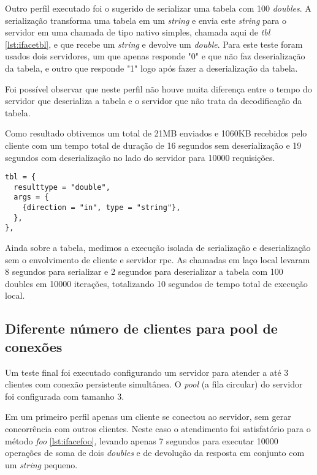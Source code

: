 \documentclass[11pt]{article}
\begin{document}
Outro perfil executado foi o sugerido de serializar uma tabela com 100
\textit{doubles}. A serialização transforma uma tabela em um \textit{string} e
envia este \textit{string} para o servidor em uma chamada de tipo nativo
simples, chamada aqui de \textit{tbl} \ref{lst:ifacetbl}, e que recebe um
\textit{string} e devolve um \textit{double}. Para este teste foram usados dois
servidores, um que apenas responde "0" e que não faz deserialização da tabela, e
outro que responde "1" logo após fazer a deserialização da tabela.

Foi possível observar que neste perfil não houve muita diferença entre o tempo
do servidor que deserializa a tabela e o servidor que não trata da decodificação
da tabela.

Como resultado obtivemos um total de 21MB enviados e 1060KB recebidos pelo
cliente com um tempo total de duração de 16 segundos sem deserialização e 19
segundos com deserialização no lado do servidor para 10000 requisições.

\begin{lstlisting}[caption={Interface tbl},label={lst:ifacetbl}]
tbl = {
  resulttype = "double",
  args = {
    {direction = "in", type = "string"},
  },
},
\end{lstlisting}

Ainda sobre a tabela, medimos a execução isolada de serialização e
deserialização sem o envolvimento de cliente e servidor \gls{rpc}. As chamadas
em laço local levaram 8 segundos para serializar e 2 segundos para deserializar
a tabela com 100 doubles em 10000 iterações, totalizando 10 segundos de tempo
total de execução local.

\subsection{Diferente número de clientes para pool de conexões}\label{subsec:diffpool}

Um teste final foi executado configurando um servidor para atender a até 3
clientes com conexão persistente simultânea. O \textit{pool} (a fila circular)
do servidor foi configurada com tamanho 3.

Em um primeiro perfil apenas um cliente se conectou ao servidor, sem gerar
concorrência com outros clientes. Neste caso o atendimento foi satisfatório para
o método \textit{foo} \ref{lst:ifacefoo}, levando apenas 7 segundos para executar
10000 operações de soma de dois \textit{doubles} e de devolução da resposta em
conjunto com um \textit{string} pequeno.
\end{document}
